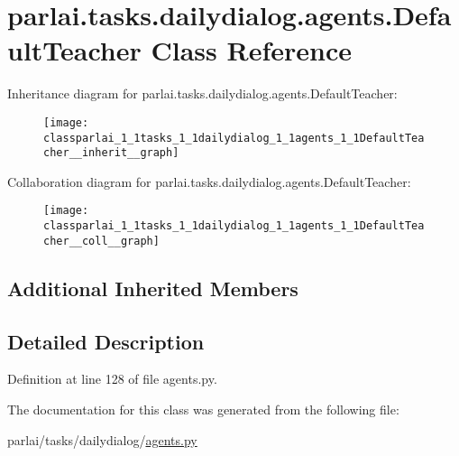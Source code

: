 \hypertarget{classparlai_1_1tasks_1_1dailydialog_1_1agents_1_1DefaultTeacher}{}\section{parlai.\+tasks.\+dailydialog.\+agents.\+Default\+Teacher Class Reference}
\label{classparlai_1_1tasks_1_1dailydialog_1_1agents_1_1DefaultTeacher}


Inheritance diagram for parlai.\+tasks.\+dailydialog.\+agents.\+Default\+Teacher\+:
\nopagebreak
\begin{figure}[H]
\begin{center}
\leavevmode
\texttt{[image: classparlai\_1\_1tasks\_1\_1dailydialog\_1\_1agents\_1\_1DefaultTeacher\_\_inherit\_\_graph]}
\end{center}
\end{figure}


Collaboration diagram for parlai.\+tasks.\+dailydialog.\+agents.\+Default\+Teacher\+:
\nopagebreak
\begin{figure}[H]
\begin{center}
\leavevmode
\texttt{[image: classparlai\_1\_1tasks\_1\_1dailydialog\_1\_1agents\_1\_1DefaultTeacher\_\_coll\_\_graph]}
\end{center}
\end{figure}
\subsection*{Additional Inherited Members}


\subsection{Detailed Description}


Definition at line 128 of file agents.\+py.



The documentation for this class was generated from the following file\+:\begin{DoxyCompactItemize}
\item 
parlai/tasks/dailydialog/\hyperlink{parlai_2tasks_2dailydialog_2agents_8py}{agents.\+py}\end{DoxyCompactItemize}

